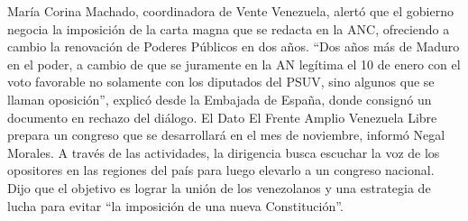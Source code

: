 \documentclass{article}%
\begin{document}
\newline%
%
María Corina Machado, coordinadora de Vente Venezuela, alertó que el gobierno negocia la imposición de la carta magna que se redacta en la ANC, ofreciendo a cambio la renovación de Poderes Públicos en dos años.%
\newline%
%
“Dos años más de Maduro en el poder, a cambio de que se juramente en la AN legítima el 10 de enero con el voto favorable no solamente con los diputados del PSUV, sino algunos que se llaman oposición”, explicó desde la Embajada de España, donde consignó un documento en rechazo del diálogo.%
\newline%
%
El Dato%
\newline%
%
El Frente Amplio Venezuela Libre prepara un congreso que se desarrollará en el mes de noviembre, informó Negal Morales. A través de las actividades, la dirigencia busca escuchar la voz de los opositores en las regiones del país para luego elevarlo a un congreso nacional. Dijo que el objetivo es lograr la unión de los venezolanos y una estrategia de lucha para evitar “la imposición de una nueva Constitución”.%
\newline%
%
\end{document}
